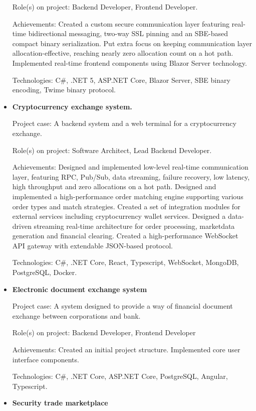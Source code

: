 \documentclass{article}
\begin{document}
\begin{itemize}
{        Role(s) on project: Backend Developer, Frontend Developer.
        
        Achievements:
        Created a custom secure communication layer featuring real-time bidirectional messaging, two-way SSL pinning and an SBE-based compact binary serialization.
        Put extra focus on keeping communication layer allocation-effective, reaching nearly zero allocation count on a hot path.
        Implemented real-time frontend components using Blazor Server technology.
        
        Technologies: C\#, .NET 5, ASP.NET Core, Blazor Server, SBE binary encoding, Twime binary protocol.
    }
    \item {
        \textbf{Cryptocurrency exchange system.}
        
        Project case: A backend system and a web terminal for a cryptocurrency exchange.
        
        Role(s) on project: Software Architect, Lead Backend Developer.
        
        Achievements:
        Designed and implemented low-level real-time communication layer, featuring RPC, Pub/Sub, data streaming, failure recovery, low latency, high throughput and zero allocations on a hot path.
        Designed and implemented a high-performance order matching engine supporting various order types and match strategies.
        Created a set of integration modules for external services including cryptocurrency wallet services.
        Designed a data-driven streaming real-time architecture for order processing, marketdata generation and financial clearing.
        Created a high-performance WebSocket API gateway with extendable JSON-based protocol.
        
        Technologies: C\#, .NET Core, React, Typescript, WebSocket, MongoDB, PostgreSQL, Docker.
    }
    \item {
        \textbf{Electronic document exchange system}
        
        Project case: A system designed to provide a way of financial document exchange between corporations and bank.
        
        Role(s) on project: Backend Developer, Frontend Developer
        
        Achievements:
        Created an initial project structure.
        Implemented core user interface components.
        
        Technologies: C\#, .NET Core, ASP.NET Core, PostgreSQL, Angular, Typescript.
    }
    \item {
        \textbf{Security trade marketplace}
        
}
\end{itemize}
\end{document}
